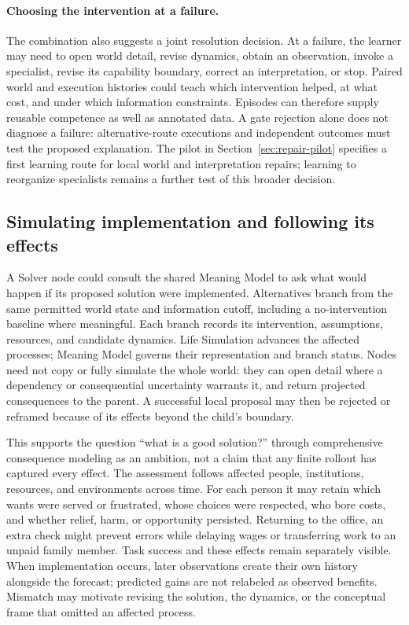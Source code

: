 \documentclass[10pt]{article}
\begin{document}
\paragraph{Choosing the intervention at a failure.}
The combination also suggests a joint resolution decision. At a failure, the
learner may need to open world detail, revise dynamics, obtain an observation,
invoke a specialist, revise its capability boundary, correct an interpretation,
or stop. Paired world and execution histories could teach which intervention
helped, at what cost, and under which information constraints. Episodes can
therefore supply reusable competence as well as annotated data. A gate
rejection alone does not diagnose a failure: alternative-route executions and
independent outcomes must test the proposed explanation. The pilot in Section~\ref{sec:repair-pilot}
specifies a first learning route for local world and interpretation repairs;
learning to reorganize specialists remains a further test of this broader
decision.

\subsection{Simulating implementation and following its effects}
\label{sec:implementation-effects}
A Solver node could consult the shared Meaning Model to ask what would happen
if its proposed solution were implemented. Alternatives branch from the same
permitted world state and information cutoff, including a no-intervention
baseline where meaningful. Each branch records its intervention, assumptions,
resources, and candidate dynamics. Life Simulation advances the affected
processes; Meaning Model governs their representation and branch status.
Nodes need not copy or fully simulate the whole world: they can open detail
where a dependency or consequential uncertainty warrants it, and return
projected consequences to the parent. A successful local proposal may then be
rejected or reframed because of its effects beyond the child's boundary.

This supports the question ``what is a good solution?'' through comprehensive
consequence modeling as an ambition, not a claim that any finite rollout has
captured every effect. The assessment follows affected people, institutions,
resources, and environments across time. For each person it may retain which
wants were served or frustrated, whose choices were respected, who bore costs,
and whether relief, harm, or opportunity persisted. Returning to the office,
an extra check might prevent errors while delaying wages or transferring work
to an unpaid family member. Task success and these effects remain separately
visible. When implementation occurs, later observations create their own
history alongside the forecast; predicted gains are not relabeled as observed
benefits. Mismatch may motivate revising the solution, the dynamics, or the
conceptual frame that omitted an affected process.
\end{document}

